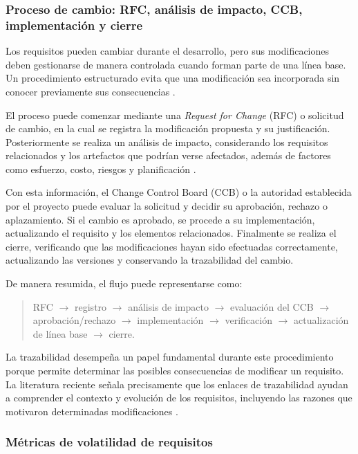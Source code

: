 \documentclass[journal,onecolumn]{IEEEtran}
\begin{document}
	\subsubsection{Proceso de cambio: RFC, análisis de impacto, CCB, implementación y cierre}
	
	Los requisitos pueden cambiar durante el desarrollo, pero sus modificaciones deben gestionarse de manera controlada cuando forman parte de una línea base. Un procedimiento estructurado evita que una modificación sea incorporada sin conocer previamente sus consecuencias \cite{Mucha2024}.
	
	El proceso puede comenzar mediante una \textit{Request for Change} (RFC) o solicitud de cambio, en la cual se registra la modificación propuesta y su justificación. Posteriormente se realiza un análisis de impacto, considerando los requisitos relacionados y los artefactos que podrían verse afectados, además de factores como esfuerzo, costo, riesgos y planificación \cite{ISO12207-2017}.
	
	Con esta información, el Change Control Board (CCB) o la autoridad establecida por el proyecto puede evaluar la solicitud y decidir su aprobación, rechazo o aplazamiento. Si el cambio es aprobado, se procede a su implementación, actualizando el requisito y los elementos relacionados. Finalmente se realiza el cierre, verificando que las modificaciones hayan sido efectuadas correctamente, actualizando las versiones y conservando la trazabilidad del cambio.
	
	De manera resumida, el flujo puede representarse como:
	
	\begin{quote}
		RFC $\rightarrow$ registro $\rightarrow$ análisis de impacto $\rightarrow$ evaluación del CCB $\rightarrow$ aprobación/rechazo $\rightarrow$ implementación $\rightarrow$ verificación $\rightarrow$ actualización de línea base $\rightarrow$ cierre.
	\end{quote}
	
	La trazabilidad desempeña un papel fundamental durante este procedimiento porque permite determinar las posibles consecuencias de modificar un requisito. La literatura reciente señala precisamente que los enlaces de trazabilidad ayudan a comprender el contexto y evolución de los requisitos, incluyendo las razones que motivaron determinadas modificaciones \cite{Mucha2024}.
	
	\subsubsection{Métricas de volatilidad de requisitos}
	
\end{document}
